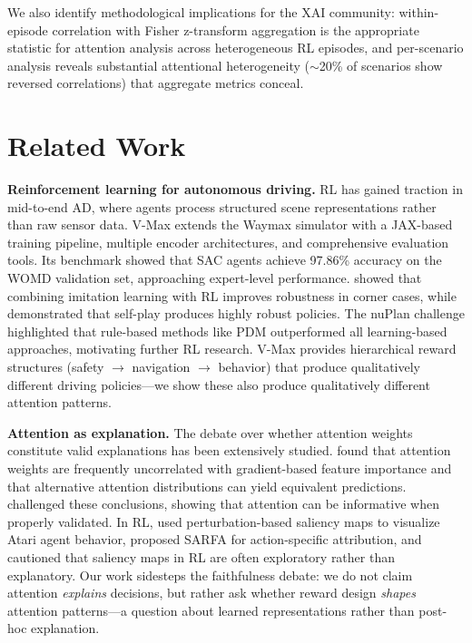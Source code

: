\documentclass[10pt]{article} %
\begin{document}
We also identify methodological implications for the XAI community: within-episode correlation with Fisher z-transform aggregation \citep{fisher1921probable} is the appropriate statistic for attention analysis across heterogeneous RL episodes, and per-scenario analysis reveals substantial attentional heterogeneity (${\sim}$20\% of scenarios show reversed correlations) that aggregate metrics conceal.


\section{Related Work}
\label{sec:related}

\textbf{Reinforcement learning for autonomous driving.}
RL has gained traction in mid-to-end AD, where agents process structured scene representations rather than raw sensor data. V-Max \citep{charraut2025vmax} extends the Waymax simulator \citep{gulino2023waymax} with a JAX-based training pipeline, multiple encoder architectures, and comprehensive evaluation tools. Its benchmark showed that SAC agents achieve 97.86\% accuracy on the WOMD validation set, approaching expert-level performance. \citet{lu2023imitation} showed that combining imitation learning with RL improves robustness in corner cases, while \citet{cusumano2025robust} demonstrated that self-play produces highly robust policies. The nuPlan challenge \citep{karnchanachari2024nuplan} highlighted that rule-based methods like PDM \citep{dauner2023pdm} outperformed all learning-based approaches, motivating further RL research. V-Max provides hierarchical reward structures (safety $\to$ navigation $\to$ behavior) that produce qualitatively different driving policies---we show these also produce qualitatively different attention patterns.

\textbf{Attention as explanation.}
The debate over whether attention weights constitute valid explanations has been extensively studied. \citet{jain2019attention} found that attention weights are frequently uncorrelated with gradient-based feature importance and that alternative attention distributions can yield equivalent predictions. \citet{wiegreffe2019attention} challenged these conclusions, showing that attention can be informative when properly validated. In RL, \citet{greydanus2018visualizing} used perturbation-based saliency maps to visualize Atari agent behavior, \citet{gupta2020sarfa} proposed SARFA for action-specific attribution, and \citet{atrey2020exploratory} cautioned that saliency maps in RL are often exploratory rather than explanatory. Our work sidesteps the faithfulness debate: we do not claim attention \textit{explains} decisions, but rather ask whether reward design \textit{shapes} attention patterns---a question about learned representations rather than post-hoc explanation.
\end{document}
